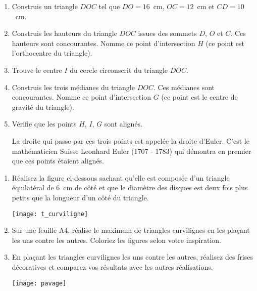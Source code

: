 
\begin{TP}

\begin{enumerate}
\item Construis un triangle $DOC$ tel que $DO = 16$ cm, $OC = 12$ cm et $CD = 10$ cm.
\item Construis les hauteurs du triangle $DOC$ issues des sommets $D$, $O$ et $C$. Ces hauteurs sont concourantes. Nomme ce point d'intersection $H$ (ce point est l'orthocentre du triangle).
\item Trouve le centre $I$ du cercle circonscrit du triangle $DOC$.
\item Construis les trois médianes du triangle $DOC$. Ces médianes sont concourantes. Nomme ce point d'intersection $G$ (ce point est le centre de gravité du triangle).
\item Vérifie que les points $H$, $I$, $G$ sont alignés.

La droite qui passe par ces trois points est appelée la droite d'Euler. C'est le mathématicien Suisse Leonhard Euler (1707 - 1783) qui démontra en premier que ces points étaient alignés.
\end{enumerate}

\end{TP}


\begin{TP}


\begin{enumerate}
 \item Réalisez la figure ci-dessous sachant qu'elle est composée d'un triangle équilatéral de 6 cm de côté et que le diamètre des disques est deux fois plus petits que la longueur d'un côté du triangle.
 
 \begin{center} \texttt{[image: t\_curviligne]} \end{center}


 \item Sur une feuille A4, réalise le maximum de triangles curvilignes en les plaçant les uns contre les autres. Coloriez les figures selon votre inspiration.
 \item En plaçant les triangles curvilignes les uns contre les autres, réalisez des frises décoratives et comparez vos résultats avec les autres réalisations.
 \begin{center} \texttt{[image: pavage]} \end{center}

 \end{enumerate}

\end{TP}


